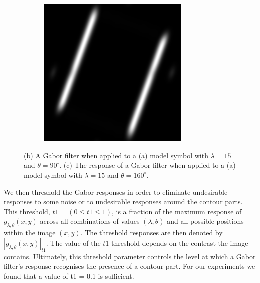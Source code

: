 \begin{figure}[h]
\begin{subfigure}[b]{0.3\textwidth}
                \caption{}
                \label{fig:gab1090}
        \end{subfigure}
        \begin{subfigure}[b]{0.3\textwidth}
                \centering
                \includegraphics[width=0.8\textwidth]{figures/Method/gabor1_15_160.png}
                \caption{}
                \label{fig:gab10130}
        \end{subfigure} 
        \caption[Gabor filter applications]{(b) A Gabor filter when applied to a (a) model symbol with $\lambda = 15 $ and $\theta = 90^{\circ}$. (c) The response of a Gabor filter when applied to a (a) model symbol with $\lambda = 15 $ and $\theta = 160^{\circ}$.}
        \label{fig:ModelGabor}
\end{figure}


We then threshold the Gabor responses in order to eliminate undesirable responses to some noise or to undesirable responses around the contour parts. This threshold, $t1 = (0 \leq t1 \leq 1)$, is a fraction of the maximum response of $g_{\lambda,\theta}(x,y)$ across all combinations of values $(\lambda,\theta)$ and all possible positions within the image $(x,y)$. The threshold responses are then denoted by $| g_{\lambda,\theta}(x,y)|_{t1}$. The value of the $t1$ threshold depends on the contrast the image contains. Ultimately, this threshold parameter controls the level at which a Gabor filter's response recognises the presence of a contour part. For our experiments we found that a value of t1 = 0.1 is sufficient.\\


